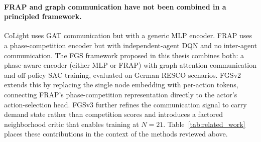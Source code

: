 \paragraph{FRAP and graph communication have not been combined in a principled framework.}
CoLight uses GAT communication but with a generic MLP encoder. FRAP uses a phase-competition encoder but with independent-agent DQN and no inter-agent communication. The FGS framework proposed in this thesis combines both: a phase-aware encoder (either MLP or FRAP) with graph attention communication and off-policy SAC training, evaluated on German RESCO scenarios. FGSv2 extends this by replacing the single node embedding with per-action tokens, connecting FRAP's phase-competition representation directly to the actor's action-selection head. FGSv3 further refines the communication signal to carry demand state rather than competition scores and introduces a factored neighborhood critic that enables training at $N=21$. Table~\ref{tab:related_work} places these contributions in the context of the methods reviewed above.

